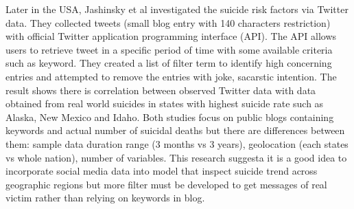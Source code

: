 Later in the USA, Jashinsky et al \cite{Jashinsky2014}  investigated the suicide risk factors via Twitter data. They collected tweets (small blog entry with 140 characters restriction) with official Twitter application programming interface (API). The API allows users to retrieve tweet in a specific period of time with some available criteria such as keyword. They created a list of filter term to identify high concerning entries and attempted to remove the entries with joke, sacarstic intention. The result shows there is correlation between observed Twitter data with data obtained from real world suicides in states with highest suicide rate such as Alaska, New Mexico and Idaho. Both studies focus on public blogs containing keywords and actual number of suicidal deaths but there are differences between them: sample data duration range (3 months vs 3 years), geolocation (each states vs whole nation), number of variables. This research suggesta it is a good idea to incorporate social media data into model that inspect suicide trend across geographic regions but more filter must be developed to get messages of real victim rather than relying on keywords in blog.\\

